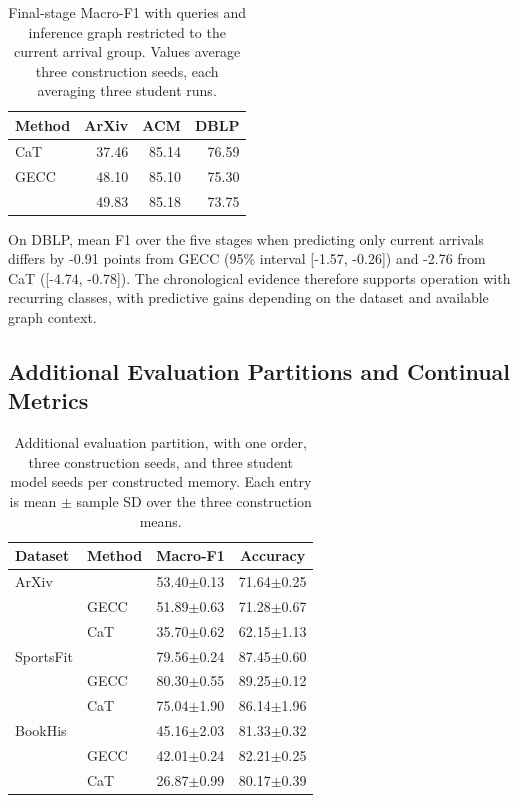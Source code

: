 \begin{table}[H]
\centering
\footnotesize
\setlength{\tabcolsep}{3pt}
\caption{Final-stage Macro-F1 with queries and inference graph restricted
to the current arrival group. Values average three construction seeds,
each averaging three student runs.}
\label{tab:temporal_current}
\begin{tabular*}{\linewidth}{@{\extracolsep{\fill}}lrrr@{}}
\toprule
Method & ArXiv & ACM & DBLP\\
\midrule
CaT & 37.46 & 85.14 & 76.59\\
GECC & 48.10 & 85.10 & 75.30\\
\method{} & 49.83 & 85.18 & 73.75\\
\bottomrule
\end{tabular*}
\end{table}

On DBLP, mean F1 over the five stages when predicting only current arrivals
differs by -0.91 points from GECC (95\% interval [-1.57, -0.26]) and
-2.76 from CaT ([-4.74, -0.78]). The chronological evidence therefore supports
operation with recurring classes, with predictive gains depending
on the dataset and available graph context.

\subsection{Additional Evaluation Partitions and Continual Metrics}

\begin{table}[H]
\centering
\footnotesize
\setlength{\tabcolsep}{3pt}
\caption{Additional evaluation partition, with one order, three construction seeds, and
three student model seeds per constructed memory. Each entry is mean \(\pm\)
sample SD over the three construction means.}
\label{tab:additional_mask}
\begin{tabular*}{\linewidth}{@{\extracolsep{\fill}}llcc@{}}
\toprule
Dataset & Method & Macro-F1 & Accuracy\\
\midrule
ArXiv & \method{} & 53.40$\pm$0.13 & 71.64$\pm$0.25\\
& GECC & 51.89$\pm$0.63 & 71.28$\pm$0.67\\
& CaT & 35.70$\pm$0.62 & 62.15$\pm$1.13\\
\midrule
SportsFit & \method{} & 79.56$\pm$0.24 & 87.45$\pm$0.60\\
& GECC & 80.30$\pm$0.55 & 89.25$\pm$0.12\\
& CaT & 75.04$\pm$1.90 & 86.14$\pm$1.96\\
\midrule
BookHis & \method{} & 45.16$\pm$2.03 & 81.33$\pm$0.32\\
& GECC & 42.01$\pm$0.24 & 82.21$\pm$0.25\\
& CaT & 26.87$\pm$0.99 & 80.17$\pm$0.39\\
\bottomrule
\end{tabular*}
\end{table}

